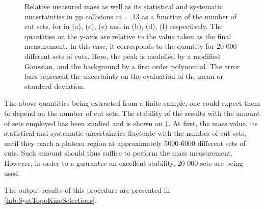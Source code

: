 \begin{figure}[!p]
\hspace*{-1.5cm}
\hspace*{-1.5cm}
\hspace*{-1.5cm}
\caption{Relative measured mass as well as its statistical and systematic uncertainties in pp collisions at \sqrtS = 13 \tev as a function of the number of cut sets, for \rmXi in (a), (c), (e) and \rmOmega in (b), (d), (f) respectively. The quantities on the y-axis are relative to the value taken as the final measurement. In this case, it corresponds to the quantity for 20 000 different sets of cuts. Here, the peak is modelled by a modified Gaussian, and the background by a first order polynomial. The error bars represent the uncertainty on the evaluation of the mean or standard deviation.}
	\label{fig:MassVsNentries}
\end{figure}

The above quantities being extracted from a finite sample, one could expect them to depend on the number of cut sets. The stability of the results with the amount of sets employed has been studied and is shown on \fig\ref{fig:MassVsNentries}. At first, the mass value, its statistical and systematic uncertainties fluctuate with the number of cut sets, until they reach a plateau region at approximately 5000-6000 different sets of cuts. Such amount should thus suffice to perform the mass measurement. However, in order to a guarantee an excellent stability, 20 000 sets are being used.

The output results of this procedure are presented in \tab\ref{tab:SystTopoKineSelections}.

